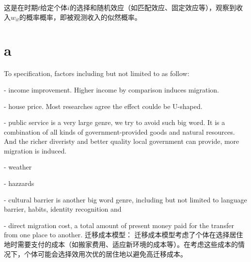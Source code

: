\documentclass[
  a4paper,
  zihao=-4,
  fontset=mac,
  AutoFakeBold,
  AutoFakeSlant,
  oneside]{ctexbook}
\begin{document}
这是在时期$t$给定个体$i$的选择和随机效应（如匹配效应、固定效应等），观察到收入$w_{it}$的概率概率，即被观测收入的似然概率。


\chapter{a}


To specification, factors including but not limited to as follow:

- income improvement. Higher income by comparison induces migration. 

- house price. Most researches agree the effect coulde be U-shaped.

- public service is a very large genre, we try to avoid such big word. It is a combination of all kinds of government-provided goods and natural resources. And the richer diveristy and better quality local government can provide, more migration is induced.

- weather

- hazzards

- cultural barrier is another big word genre, including but not limited to language barrier, habits, identity recognition and 

- direct migration cost, a total amount of present money paid for the transfer from one place to another. 迁移成本模型： 迁移成本模型考虑了个体在选择居住地时需要支付的成本（如搬家费用、适应新环境的成本等）。在考虑这些成本的情况下，个体可能会选择效用次优的居住地以避免高迁移成本。


\newpage
%
%
%
\printbibliography[heading=bibliography,title=参考文献]
\end{document}
